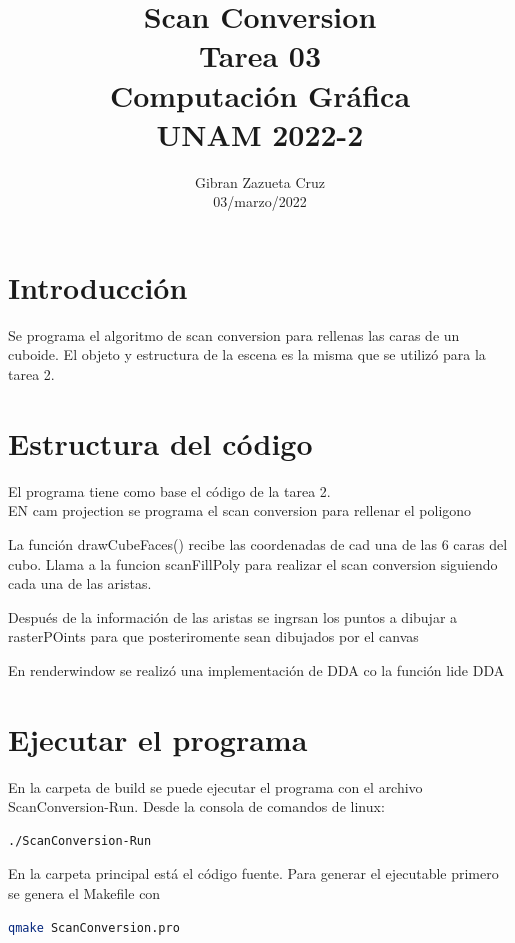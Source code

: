 \documentclass[12pt]{article}
\title{%
  Scan Conversion\\
  \large Tarea 03 \\
    \Large Computación Gráfica\\
     \large UNAM 2022-2}
\author{Gibran Zazueta Cruz \\
\small 03/marzo/2022}
\date{}
\begin{document}
\maketitle

\section{Introducción}

Se programa el algoritmo de scan conversion para rellenas las caras de un cuboide.
El objeto y estructura de la escena es la misma que se utilizó para la tarea 2.



\section{Estructura del código}

El programa tiene como base el código de la tarea 2.\\

EN cam projection se programa el scan conversion para rellenar el poligono

La función drawCubeFaces() recibe las coordenadas de cad una de las 6 caras del cubo. Llama a la funcion scanFillPoly para realizar el scan conversion siguiendo cada una de las aristas.

Después de la información de las aristas se ingrsan los puntos a dibujar a rasterPOints para que posteriromente sean dibujados por el canvas

En renderwindow se realizó una implementación de DDA co la función lide DDA

\section{Ejecutar el programa}
En la carpeta de build se puede ejecutar el programa con el archivo ScanConversion-Run. Desde la consola de comandos de linux:

\begin{lstlisting}[language=bash,title={bash}]
./ScanConversion-Run
\end{lstlisting}


En la carpeta principal está el código fuente. Para generar el ejecutable primero se genera el Makefile con

\begin{lstlisting}[language=bash,title={bash}]
 qmake ScanConversion.pro
\end{lstlisting}
\end{document}
